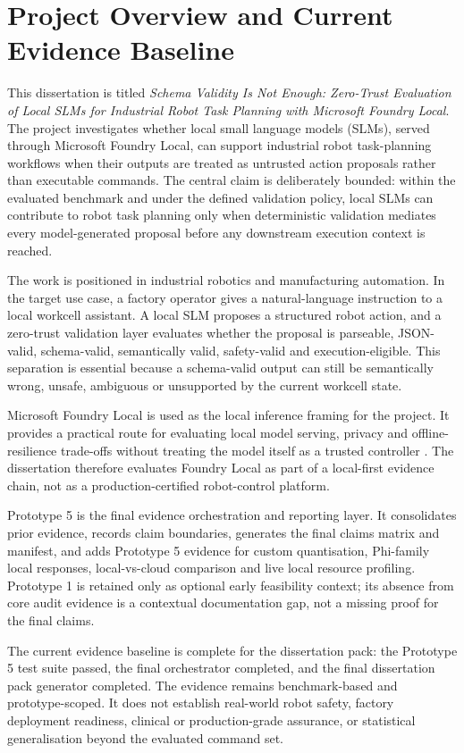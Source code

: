 \section{Project Overview and Current Evidence Baseline}
\label{sec:project_overview_current_baseline}

This dissertation is titled \emph{Schema Validity Is Not Enough: Zero-Trust Evaluation of Local SLMs for Industrial Robot Task Planning with Microsoft Foundry Local}. The project investigates whether local small language models (SLMs), served through Microsoft Foundry Local, can support industrial robot task-planning workflows when their outputs are treated as untrusted action proposals rather than executable commands. The central claim is deliberately bounded: within the evaluated benchmark and under the defined validation policy, local SLMs can contribute to robot task planning only when deterministic validation mediates every model-generated proposal before any downstream execution context is reached.

The work is positioned in industrial robotics and manufacturing automation. In the target use case, a factory operator gives a natural-language instruction to a local workcell assistant. A local SLM proposes a structured robot action, and a zero-trust validation layer evaluates whether the proposal is parseable, JSON-valid, schema-valid, semantically valid, safety-valid and execution-eligible. This separation is essential because a schema-valid output can still be semantically wrong, unsafe, ambiguous or unsupported by the current workcell state.

Microsoft Foundry Local is used as the local inference framing for the project. It provides a practical route for evaluating local model serving, privacy and offline-resilience trade-offs without treating the model itself as a trusted controller \cite{microsoft_foundry_local_docs}. The dissertation therefore evaluates Foundry Local as part of a local-first evidence chain, not as a production-certified robot-control platform.

Prototype 5 is the final evidence orchestration and reporting layer. It consolidates prior evidence, records claim boundaries, generates the final claims matrix and manifest, and adds Prototype 5 evidence for custom quantisation, Phi-family local responses, local-vs-cloud comparison and live local resource profiling. Prototype 1 is retained only as optional early feasibility context; its absence from core audit evidence is a contextual documentation gap, not a missing proof for the final claims.

The current evidence baseline is complete for the dissertation pack: the Prototype 5 test suite passed, the final orchestrator completed, and the final dissertation pack generator completed. The evidence remains benchmark-based and prototype-scoped. It does not establish real-world robot safety, factory deployment readiness, clinical or production-grade assurance, or statistical generalisation beyond the evaluated command set.
